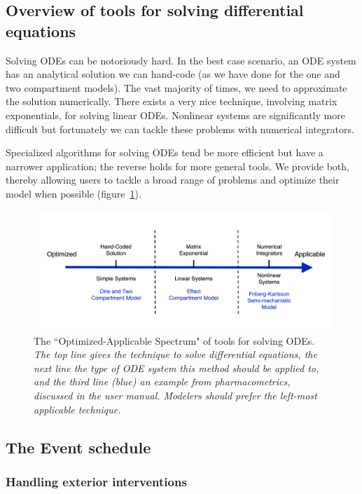 \documentclass[11pt]{article}
\begin{document}
\subsection{Overview of tools for solving differential equations}

Solving ODEs can be notoriously hard.
%
In the best case scenario, an ODE system has an analytical solution we can hand-code
(as we have done for the one and two compartment models). The vast majority of times,
we need to approximate the solution numerically. There exists a very nice technique, 
involving matrix exponentials, for solving linear ODEs. Nonlinear systems are significantly 
more difficult but fortunately we can tackle these problems with numerical integrators.

Specialized algorithms for solving ODEs tend be more efficient but have a narrower application; 
the reverse holds for more general tools. We provide both, thereby allowing users to tackle a 
broad range of problems and optimize their model when possible  (figure~\ref{DiffEqTools}).

\begin{figure}[!htb]
\begin{center}
\includegraphics[width=5in,trim=0in 0in 0 0in]{graphics/ODEsolvers_ext.png}
\caption{{The ``Optimized-Applicable Spectrum" of tools for solving ODEs. \textit{The top 
line gives the technique to solve differential equations, the next line the type of ODE 
system this method should be applied to, and the third line (blue) an example from 
pharmacometrics, discussed in the user manual. Modelers should prefer the left-most 
applicable technique.}}}
\label{DiffEqTools}
\end{center}
\end{figure}

\subsection{The Event schedule}

\subsubsection{Handling exterior interventions}
\end{document}
